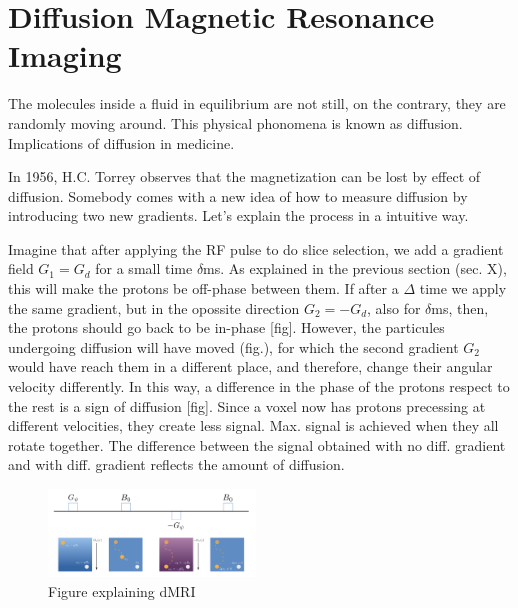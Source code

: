 

\section{Diffusion Magnetic Resonance Imaging}
The molecules inside a fluid in equilibrium are not still, on the contrary, they are randomly moving around.
This physical phonomena is known as diffusion.
Implications of diffusion in medicine.

In 1956, H.C. Torrey \cite{Torrey1956} observes that the magnetization can be lost by effect of diffusion.
Somebody comes with a new idea of how to measure diffusion by introducing two new gradients.
Let's explain the process in a intuitive way.

Imagine that after applying the RF pulse to do slice selection, we add a gradient field $G_1=G_d$ for a small time $\delta$ms.
As explained in the previous section (sec. X), this will make the protons be off-phase between them.
If after a $\Delta$ time we apply the same gradient, but in the opossite direction $G_2=-G_d$, also for $\delta$ms, then, the protons should go back to be in-phase [fig].
However, the particules undergoing diffusion will have moved (fig.), for which the second gradient $G_2$ would have reach them in a different place, and therefore, change their angular velocity differently.
In this way, a difference in the phase of the protons respect to the rest is a sign of diffusion [fig].
Since a voxel now has protons precessing at different velocities, they create less signal.
Max. signal is achieved when they all rotate together.
The difference between the signal obtained with no diff. gradient and with diff. gradient reflects the amount of diffusion.


\begin{figure}
    \includegraphics[width=0.49\textwidth]{2.background/mri/img/dmri.png}
    \caption{Figure explaining dMRI}
    \label{fig:}
\end{figure}  

